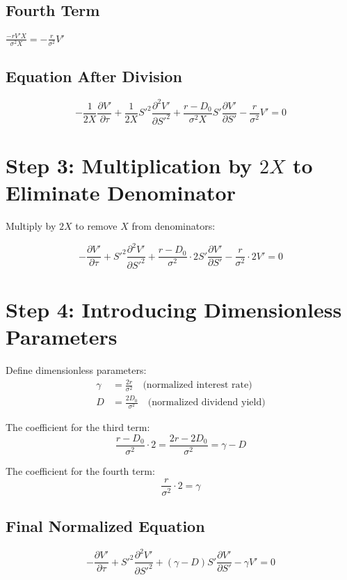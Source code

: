 \documentclass{article}
\begin{document}
\subsection*{Fourth Term}
$\frac{-r V' X}{\sigma^2 X} = -\frac{r}{\sigma^2} V'$

\subsection*{Equation After Division}
\begin{equation}
-\frac{1}{2X} \frac{\partial V'}{\partial \tau} + \frac{1}{2X} S'^2 \frac{\partial^2 V'}{\partial S'^2} + \frac{r - D_0}{\sigma^2 X} S' \frac{\partial V'}{\partial S'} - \frac{r}{\sigma^2} V' = 0
\end{equation}

\section*{Step 3: Multiplication by $2X$ to Eliminate Denominator}
Multiply by $2X$ to remove $X$ from denominators:

\begin{equation}
-\frac{\partial V'}{\partial \tau} + S'^2 \frac{\partial^2 V'}{\partial S'^2} + \frac{r - D_0}{\sigma^2} \cdot 2 S' \frac{\partial V'}{\partial S'} - \frac{r}{\sigma^2} \cdot 2 V' = 0
\end{equation}

\section*{Step 4: Introducing Dimensionless Parameters}
Define dimensionless parameters:
\begin{align*}
\gamma &= \frac{2r}{\sigma^2} \quad \text{(normalized interest rate)} \\
D &= \frac{2D_0}{\sigma^2} \quad \text{(normalized dividend yield)}
\end{align*}

The coefficient for the third term:
\begin{equation}
\frac{r - D_0}{\sigma^2} \cdot 2 = \frac{2r - 2D_0}{\sigma^2} = \gamma - D
\end{equation}

The coefficient for the fourth term:
\begin{equation}
\frac{r}{\sigma^2} \cdot 2 = \gamma
\end{equation}

\subsection*{Final Normalized Equation}
\begin{equation}
-\frac{\partial V'}{\partial \tau} + S'^2 \frac{\partial^2 V'}{\partial S'^2} + (\gamma - D) S' \frac{\partial V'}{\partial S'} - \gamma V' = 0
\end{equation}
\end{document}
